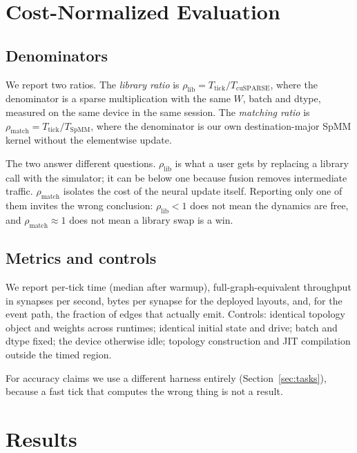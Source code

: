 \documentclass[11pt]{article}
\begin{document}
\section{Cost-Normalized Evaluation}

\subsection{Denominators}

We report two ratios. The \emph{library ratio} is
$\rho_{\text{lib}} = T_{\text{tick}} / T_{\text{cuSPARSE}}$, where the
denominator is a sparse multiplication with the same $W$, batch and dtype,
measured on the same device in the same session. The \emph{matching ratio} is
$\rho_{\text{match}} = T_{\text{tick}} / T_{\text{SpMM}}$, where the denominator
is our own destination-major SpMM kernel without the elementwise update.

The two answer different questions. $\rho_{\text{lib}}$ is what a user gets by
replacing a library call with the simulator; it can be below one because fusion
removes intermediate traffic. $\rho_{\text{match}}$ isolates the cost of the
neural update itself. Reporting only one of them invites the wrong conclusion:
$\rho_{\text{lib}} < 1$ does not mean the dynamics are free, and
$\rho_{\text{match}} \approx 1$ does not mean a library swap is a win.

\subsection{Metrics and controls}

We report per-tick time (median after warmup), full-graph-equivalent throughput
in synapses per second, bytes per synapse for the deployed layouts, and, for the
event path, the fraction of edges that actually emit. Controls: identical
topology object and weights across runtimes; identical initial state and drive;
batch and dtype fixed; the device otherwise idle; topology construction and JIT
compilation outside the timed region.

For accuracy claims we use a different harness entirely (Section~\ref{sec:tasks}),
because a fast tick that computes the wrong thing is not a result.

\section{Results}


\end{document}
